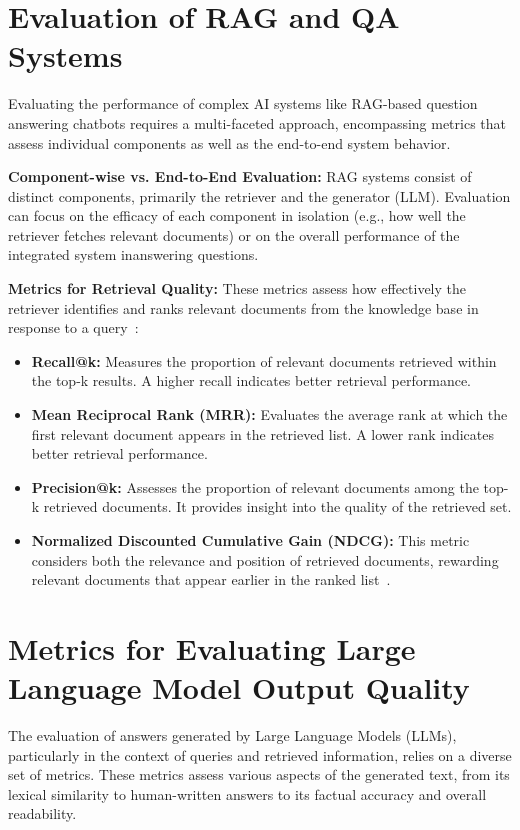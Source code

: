 \documentclass[12pt]{report}
\begin{document}
\section{Evaluation of RAG and QA Systems}

Evaluating the performance of complex AI systems like RAG-based question answering chatbots requires a multi-faceted approach, encompassing metrics that assess individual components as well as the end-to-end system behavior.

\textbf{Component-wise vs. End-to-End Evaluation:} RAG systems consist of distinct components, primarily the retriever and the generator (LLM). Evaluation can focus on the efficacy of each component in isolation (e.g., how well the retriever fetches relevant documents) or on the overall performance of the integrated system inanswering questions.

\textbf{Metrics for Retrieval Quality:} These metrics assess how effectively the retriever identifies and ranks relevant documents from the knowledge base in response to a query~\cite{manning2008ir, burges2005learning, pinecone2023evaluation}:
\begin{itemize}
    \item \textbf{Recall@k:} Measures the proportion of relevant documents retrieved within the top-k results. A higher recall indicates better retrieval performance.
    \item \textbf{Mean Reciprocal Rank (MRR):} Evaluates the average rank at which the first relevant document appears in the retrieved list. A lower rank indicates better retrieval performance.
    \item \textbf{Precision@k:} Assesses the proportion of relevant documents among the top-k retrieved documents. It provides insight into the quality of the retrieved set.
    \item \textbf{Normalized Discounted Cumulative Gain (NDCG):} This metric considers both the relevance and position of retrieved documents, rewarding relevant documents that appear earlier in the ranked list~\cite{evidently2023ndcg}.
\end{itemize}

\section{Metrics for Evaluating Large Language Model Output Quality}

The evaluation of answers generated by Large Language Models (LLMs), particularly in the context of queries and retrieved information, relies on a diverse set of metrics. These metrics assess various aspects of the generated text, from its lexical similarity to human-written answers to its factual accuracy and overall readability.
\end{document}
